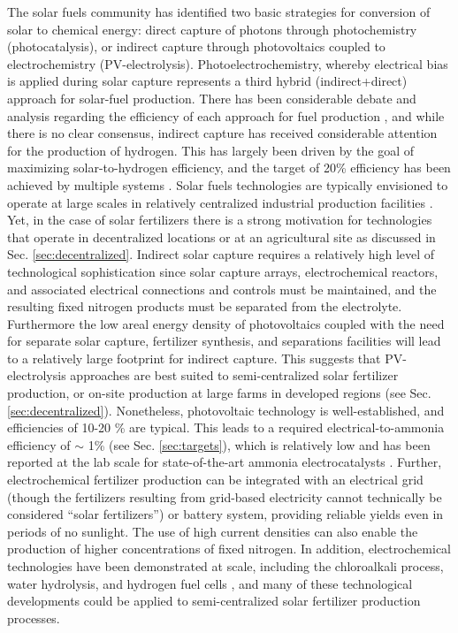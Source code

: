 The solar fuels community has identified two basic strategies for conversion of solar to chemical energy: direct capture of photons through photochemistry (photocatalysis), or indirect capture through photovoltaics coupled to electrochemistry (PV-electrolysis)\cite{McDaniel_2010,Highfield_2015}. Photoelectrochemistry, whereby electrical bias is applied during solar capture represents a third hybrid (indirect+direct) approach for solar-fuel production. There has been considerable debate and analysis regarding the efficiency of each approach for fuel production \cite{Montoya_2017,Daviseaas9793,Lewis_2016,Herron_2015}, and while there is no clear consensus, indirect capture has received considerable attention for the production of hydrogen. This has largely been driven by the goal of maximizing solar-to-hydrogen efficiency, and the target of 20\% efficiency has been achieved by multiple systems \cite{Nakamura_2015,Jia_2016}. Solar fuels technologies are typically envisioned to operate at large scales in relatively centralized industrial production facilities \cite{Shaner_2016}. Yet, in the case of solar fertilizers there is a strong motivation for technologies that operate in decentralized locations or at an agricultural site as discussed in Sec. \ref{sec:decentralized}. Indirect solar capture requires a relatively high level of technological sophistication since solar capture arrays, electrochemical reactors, and associated electrical connections and controls must be maintained, and the resulting fixed nitrogen products must be separated from the electrolyte. Furthermore the low areal energy density of photovoltaics \cite{MacKay_2013} coupled with the need for separate solar capture, fertilizer synthesis, and separations facilities will lead to a relatively large footprint for indirect capture. This suggests that PV-electrolysis approaches are best suited to semi-centralized solar fertilizer production, or on-site production at large farms in developed regions (see Sec. \ref{sec:decentralized}). Nonetheless, photovoltaic technology is well-established, and efficiencies of 10-20 \% are typical. This leads to a required electrical-to-ammonia efficiency of $\sim$ 1\% (see Sec. \ref{sec:targets}), which is relatively low and has been reported at the lab scale for state-of-the-art ammonia electrocatalysts \cite{Liu2018,Qiu_2018,Song_2018,Zhang_2018,Luo_2018}. Further, electrochemical fertilizer production can be integrated with an electrical grid (though the fertilizers resulting from grid-based electricity cannot technically be considered ``solar fertilizers'') or battery system, providing reliable yields even in periods of no sunlight. The use of high current densities can also enable the production of higher concentrations of fixed nitrogen. In addition, electrochemical technologies have been demonstrated at scale, including the chloroalkali process, water hydrolysis, and hydrogen fuel cells  \cite{Burney1993,LEROY_1983,fuel_cells_2016}, and many of these technological developments could be applied to semi-centralized solar fertilizer production processes.

